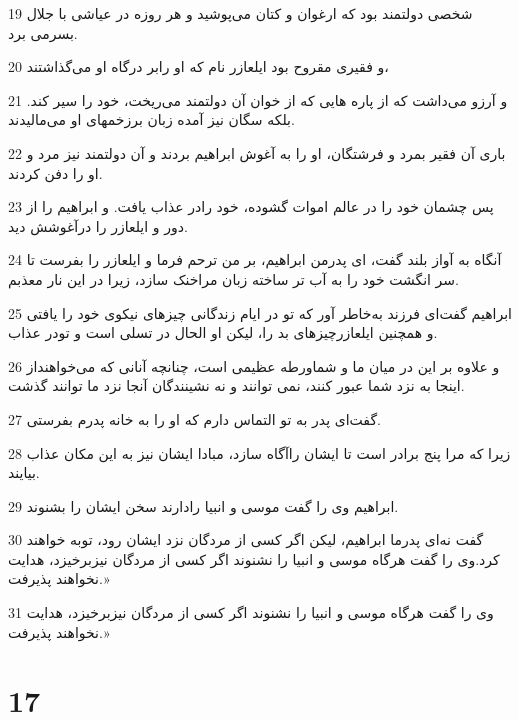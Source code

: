 \par 19 شخصی دولتمند بود که ارغوان و کتان می‌پوشید و هر روزه در عیاشی با جلال بسرمی برد.
\par 20 و فقیری مقروح بود ایلعازر نام که او رابر درگاه او می‌گذاشتند،
\par 21 و آرزو می‌داشت که از پاره هایی که از خوان آن دولتمند می‌ریخت، خود را سیر کند. بلکه سگان نیز آمده زبان برزخمهای او می‌مالیدند.
\par 22 باری آن فقیر بمرد و فرشتگان، او را به آغوش ابراهیم بردند و آن دولتمند نیز مرد و او را دفن کردند.
\par 23 پس چشمان خود را در عالم اموات گشوده، خود رادر عذاب یافت. و ابراهیم را از دور و ایلعازر را درآغوشش دید.
\par 24 آنگاه به آواز بلند گفت، ای پدرمن ابراهیم، بر من ترحم فرما و ایلعازر را بفرست تا سر انگشت خود را به آب تر ساخته زبان مراخنک سازد، زیرا در این نار معذبم.
\par 25 ابراهیم گفت‌ای فرزند به‌خاطر آور که تو در ایام زندگانی چیزهای نیکوی خود را یافتی و همچنین ایلعازرچیزهای بد را، لیکن او الحال در تسلی است و تودر عذاب.
\par 26 و علاوه بر این در میان ما و شماورطه عظیمی است، چنانچه آنانی که می‌خواهنداز اینجا به نزد شما عبور کنند، نمی توانند و نه نشینندگان آنجا نزد ما توانند گذشت.
\par 27 گفت‌ای پدر به تو التماس دارم که او را به خانه پدرم بفرستی.
\par 28 زیرا که مرا پنج برادر است تا ایشان راآگاه سازد، مبادا ایشان نیز به این مکان عذاب بیایند.
\par 29 ابراهیم وی را گفت موسی و انبیا رادارند سخن ایشان را بشنوند.
\par 30 گفت نه‌ای پدرما ابراهیم، لیکن اگر کسی از مردگان نزد ایشان رود، توبه خواهند کرد.وی را گفت هرگاه موسی و انبیا را نشنوند اگر کسی از مردگان نیزبرخیزد، هدایت نخواهند پذیرفت.»
\par 31 وی را گفت هرگاه موسی و انبیا را نشنوند اگر کسی از مردگان نیزبرخیزد، هدایت نخواهند پذیرفت.»

\chapter{17}

